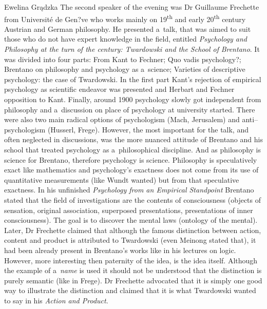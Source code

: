 \begin{editorialeng}{Ewelina Grądzka}
The second speaker of the evening was Dr Guillaume Frechette from Université de Gen?ve who works mainly on 19\textsuperscript{th} and early 20\textsuperscript{th} century Austrian and German philosophy. He presented a~talk, that was aimed to suit those who do not have expert knowledge in the field, entitled \textit{Psychology and Philosophy at the turn of the century: Twardowski and the School of} \textit{Brentano}. It was divided into four parts: From Kant to Fechner; Quo vadis psychology?; Brentano on philosophy and psychology as a~science; Varieties of descriptive psychology: the case of Twardowski. In the first part Kant’s rejection of empirical psychology as scientific endeavor was presented and Herbart and Fechner opposition to Kant. Finally, around 1900 psychology slowly got independent from philosophy and a~discussion on place of psychology at university started. There were also two main radical options of psychologism (Mach, Jerusalem) and anti--psychologism (Husserl, Frege). However, the most important for the talk, and often neglected in discussions, was the more nuanced attitude of Brentano and his school that treated psychology as a~philosophical discipline. And as philosophy is science for Brentano, therefore psychology is science. Philosophy is speculatively exact like mathematics and psychology’s exactness does not come from its use of quantitative measurements (like Wundt wanted) but from that speculative exactness. In his unfinished \textit{Psychology from an Empirical Standpoint} Brentano stated that the field of investigations are the contents of consciousness (objects of sensation, original association, superposed presentations, presentations of inner consciousness). The goal is to discover the mental laws (ontology of the mental). Later, Dr Frechette claimed that although the famous distinction between action, content and product is attributed to Twardowski (even Meinong stated that), it had been already present in Brentano’s works like in his lectures on logic. However, more interesting then paternity of the idea, is the idea itself. Although the example of a~\textit{name} is used it should not be understood that the distinction is purely semantic (like in Frege). Dr Frechette advocated that it is simply one good way to illustrate the distinction and claimed that it is what Twardowski wanted to say in his \textit{Action and Product}.


\end{editorialeng}
